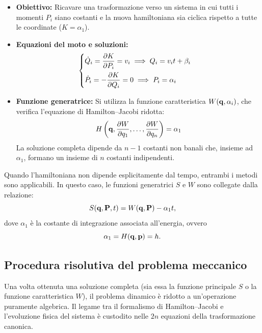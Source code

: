 \begin{itemize}
    \item \textbf{Obiettivo:} Ricavare una trasformazione verso un sistema in cui tutti i momenti $P_i$ siano costanti e la nuova hamiltoniana sia ciclica rispetto a tutte le coordinate ($K = \alpha_1$).
    \item \textbf{Equazioni del moto e soluzioni:}
    \begin{equation*}
        \begin{cases} 
            \displaystyle \dot{Q}_i = \pdv{K}{P_i} = v_i \implies Q_i = v_i t + \beta_i \\[0.3cm]
            \displaystyle \dot{P}_i = -\pdv{K}{Q_i} = 0 \implies P_i = \alpha_i 
        \end{cases}
    \end{equation*}
    \item \textbf{Funzione generatrice:} Si utilizza la funzione caratteristica $W(\vb{q}, \alpha_i)$, che verifica l'equazione di Hamilton--Jacobi ridotta:
    \begin{equation*}
        H\left( \vb{q}, \pdv{W}{q_1}, \dots, \pdv{W}{q_n} \right) = \alpha_1
    \end{equation*}
    La soluzione completa dipende da $n-1$ costanti non banali che, insieme ad $\alpha_1$, formano un insieme di $n$ costanti indipendenti.
\end{itemize}

\begin{remark}

Quando l'hamiltoniana non dipende esplicitamente dal tempo, entrambi i metodi sono applicabili. In questo caso, le funzioni generatrici $S$ e $W$ sono collegate dalla relazione:
\begin{equation*}
    S(\vb{q}, \vb{P}, t) = W(\vb{q}, \vb{P}) - \alpha_1 t,
\end{equation*}
dove $\alpha_1$ è la costante di integrazione associata all'energia, ovvero $$\alpha_1 = H(\vb{q}, \vb{p}) = h.$$
\end{remark}

\subsection{Procedura risolutiva del problema meccanico}

Una volta ottenuta una soluzione completa (sia essa la funzione principale $S$ o la funzione caratteristica $W$), il problema dinamico è ridotto a un'operazione puramente algebrica. Il legame tra il formalismo di Hamilton--Jacobi e l'evoluzione fisica del sistema è custodito nelle $2n$ equazioni della trasformazione canonica.

